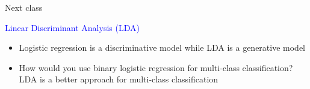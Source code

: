 \documentclass[14pt]{beamer}
\begin{document}
\begin{frame}{Next class}


\begin{center} \textcolor{blue}{Linear Discriminant Analysis (LDA)} \end{center}

\begin{itemize}
	\item Logistic regression is a discriminative model while LDA is a generative model
	\item How would you use binary logistic regression for multi-class classification? LDA is a better approach for multi-class classification
\end{itemize}

\end{frame}
\end{document}
